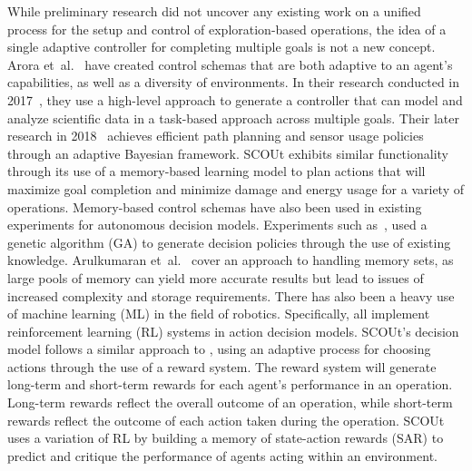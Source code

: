 While preliminary research did not uncover any existing work on a unified process for the setup and control of exploration-based operations, the idea of a single adaptive controller for completing multiple goals is not a new concept.
Arora et~al.~\cite{arora_approach_2017, hutter_online_2018} have created control schemas that are both adaptive to an agent's capabilities, as well as a diversity of environments.
In their research conducted in 2017~\cite{arora_approach_2017}, they use a high-level approach to generate a controller that can model and analyze scientific data in a task-based approach across multiple goals.
Their later research in 2018~\cite{hutter_online_2018} achieves efficient path planning and sensor usage policies through an adaptive Bayesian framework.
SCOUt exhibits similar functionality through its use of a memory-based learning model to plan actions that will maximize goal completion and minimize damage and energy usage for a variety of operations.
Memory-based control schemas have also been used in existing experiments for autonomous decision models.
Experiments such as~\cite{fu_genetic_2003, yi_new_2011}, used a genetic algorithm (GA) to generate decision policies through the use of existing knowledge.
Arulkumaran et~al.~\cite{arulkumaran_brief_2017} cover an approach to handling memory sets, as large pools of memory can yield more accurate results but lead to issues of increased complexity and storage requirements.
There has also been a heavy use of machine learning (ML) in the field of robotics.
Specifically, \cite{arulkumaran_brief_2017, bai_toward_2017, kiumarsi_optimal_2018} all implement reinforcement learning (RL) systems in action decision models.
SCOUt's decision model follows a similar approach to \cite{kiumarsi_optimal_2018}, using an adaptive process for choosing actions through the use of a reward system.
The reward system will generate long-term and short-term rewards for each agent's performance in an operation.
Long-term rewards reflect the overall outcome of an operation, while short-term rewards reflect the outcome of each action taken during the operation.
SCOUt uses a variation of RL by building a memory of state-action rewards (SAR) to predict and critique the performance of agents acting within an environment.



